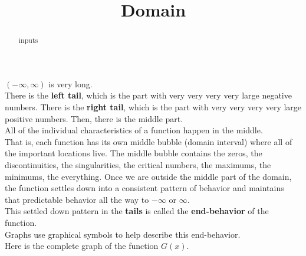 \documentclass{ximera}
\title{Domain}
\begin{document}
\begin{abstract}
inputs
\end{abstract}
\maketitle


$(-\infty, \infty)$ is very long. \\



There is the \textbf{\textcolor{red!80!black}{left tail}}, which is the part with very very very very large negative numbers. There is the \textbf{\textcolor{red!80!black}{right tail}}, which is the part with very very very very large positive numbers. Then, there is the middle part. \\

All of the individual characteristics of a function happen in the middle. \\

That is, each function has its own middle bubble (domain interval) where all of the important locations live.  The middle bubble contains the zeros, the discontinuities, the singularities, the critical numbers, the maximums, the minimums, the everything.  Once we are outside the middle part of the domain, the function settles down into a consistent pattern of behavior and maintains that predictable behavior all the way to $-\infty$ or $\infty$. \\

This settled down pattern in the \textbf{\textcolor{red!80!black}{tails}} is called the \textbf{\textcolor{red!80!black}{end-behavior}} of the function. \\


Graphs use graphical symbols to help describe this end-behavior.\\


Here is the complete graph of the function $G(x)$. \\
\end{document}
